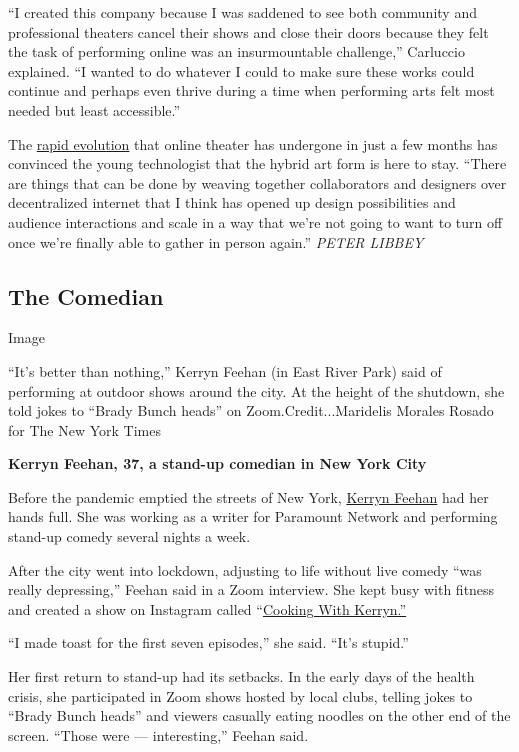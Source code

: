 ``I created this company because I was saddened to see both community
and professional theaters cancel their shows and close their doors
because they felt the task of performing online was an insurmountable
challenge,'' Carluccio explained. ``I wanted to do whatever I could to
make sure these works could continue and perhaps even thrive during a
time when performing arts felt most needed but least accessible.''

The
\href{https://www.nytimes3xbfgragh.onion/2020/07/08/theater/streaming-theater-experiments.html}{rapid
evolution} that online theater has undergone in just a few months has
convinced the young technologist that the hybrid art form is here to
stay. ``There are things that can be done by weaving together
collaborators and designers over decentralized internet that I think has
opened up design possibilities and audience interactions and scale in a
way that we're not going to want to turn off once we're finally able to
gather in person again.'' \emph{PETER LIBBEY}

\hypertarget{the-comedian}{%
\subsection{The Comedian}\label{the-comedian}}

Image

``It's better than nothing,'' Kerryn Feehan (in East River Park) said of
performing at outdoor shows around the city. At the height of the
shutdown, she told jokes to ``Brady Bunch heads'' on
Zoom.Credit...Maridelis Morales Rosado for The New York Times

\textbf{Kerryn Feehan, 37, a stand-up comedian in New York City}

Before the pandemic emptied the streets of New York,
\href{https://twitter.com/KFreehams}{Kerryn Feehan} had her hands full.
She was working as a writer for Paramount Network and performing
stand-up comedy several nights a week.

After the city went into lockdown, adjusting to life without live comedy
``was really depressing,'' Feehan said in a Zoom interview. She kept
busy with fitness and created a show on Instagram called
``\href{https://www.instagram.com/p/CEO17H2gAr6/}{Cooking With
Kerryn.''}

``I made toast for the first seven episodes,'' she said. ``It's
stupid.''

Her first return to stand-up had its setbacks. In the early days of the
health crisis, she participated in Zoom shows hosted by local clubs,
telling jokes to ``Brady Bunch heads'' and viewers casually eating
noodles on the other end of the screen. ``Those were --- interesting,''
Feehan said.

